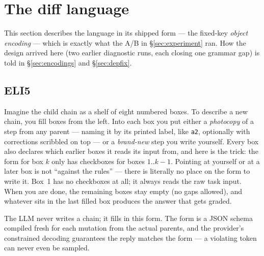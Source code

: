 \documentclass[11pt]{article}
\newenvironment{eli5}
  {\par\medskip\noindent\begin{lrbox}{\eliBox}\begin{minipage}{\dimexpr\linewidth-2\fboxsep-2\fboxrule}\small}
  {\end{minipage}\end{lrbox}\noindent\fcolorbox{accent!40}{accent!4}{\usebox{\eliBox}}\par\medskip}
\begin{document}
\section{The diff language}
\label{sec:language}
This section describes the language in its shipped form --- the fixed-key \emph{object
encoding} --- which is exactly what the A/B in \S\ref{sec:experiment} ran. How the design
arrived here (two earlier diagnostic runs, each closing one grammar gap) is told in
\S\ref{sec:encodings} and \S\ref{sec:depfix}.

\subsection{ELI5}
\begin{eli5}
Imagine the child chain as a shelf of eight numbered boxes. To describe a new chain, you
fill boxes from the left. Into each box you put either a \emph{photocopy} of a step from any
parent --- naming it by its printed label, like \texttt{a2}, optionally with corrections
scribbled on top --- or a \emph{brand-new} step you write yourself. Every box also declares
which earlier boxes it reads its input from, and here is the trick: the form for box $k$
only has checkboxes for boxes $1..k-1$. Pointing at yourself or at a later box is not
``against the rules'' --- there is literally no place on the form to write it. Box~1 has no
checkboxes at all; it always reads the raw task input. When you are done, the remaining
boxes stay empty (no gaps allowed), and whatever sits in the last filled box produces the
answer that gets graded.
\end{eli5}
\noindent
The LLM never writes a chain; it fills in this form. The form is a JSON schema compiled
fresh for each mutation from the actual parents, and the provider's constrained decoding
guarantees the reply matches the form --- a violating token can never even be sampled.
\end{document}

